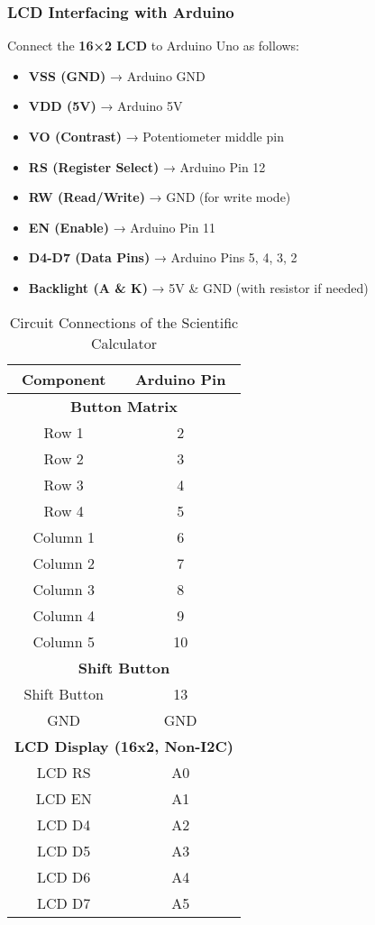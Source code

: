 \documentclass[12pt,a4paper]{article}
\begin{document}
\subsubsection{LCD Interfacing with Arduino}
Connect the \textbf{16×2 LCD} to Arduino Uno as follows:
\begin{itemize}
    \item \textbf{VSS (GND)} → Arduino GND
    \item \textbf{VDD (5V)} → Arduino 5V
    \item \textbf{VO (Contrast)} → Potentiometer middle pin
    \item \textbf{RS (Register Select)} → Arduino Pin 12
    \item \textbf{RW (Read/Write)} → GND (for write mode)
    \item \textbf{EN (Enable)} → Arduino Pin 11
    \item \textbf{D4-D7 (Data Pins)} → Arduino Pins 5, 4, 3, 2
    \item \textbf{Backlight (A \& K)} → 5V \& GND (with resistor if needed)
\end{itemize}
\newpage
\begin{table}[H]
    \centering
    \renewcommand{\arraystretch}{1.2} %
    \begin{tabular}{|c|c|}
        \hline
        \textbf{Component} & \textbf{Arduino Pin} \\
        \hline
        \multicolumn{2}{|c|}{\textbf{Button Matrix}} \\
        \hline
        Row 1 & 2 \\
        Row 2 & 3 \\
        Row 3 & 4 \\
        Row 4 & 5 \\
        Column 1 & 6 \\
        Column 2 & 7 \\
        Column 3 & 8 \\
        Column 4 & 9 \\
        Column 5 & 10 \\
        \hline
        \multicolumn{2}{|c|}{\textbf{Shift Button}} \\
        \hline
        Shift Button & 13 \\
        GND & GND \\
        \hline
        \multicolumn{2}{|c|}{\textbf{LCD Display (16x2, Non-I2C)}} \\
        \hline
        LCD RS & A0 \\
        LCD EN & A1 \\
        LCD D4 & A2 \\
        LCD D5 & A3 \\
        LCD D6 & A4 \\
        LCD D7 & A5 \\
        \hline
    \end{tabular}
    \caption{Circuit Connections of the Scientific Calculator}
    \label{tab:circuit_connections}
\end{table}
\newpage
\end{document}
